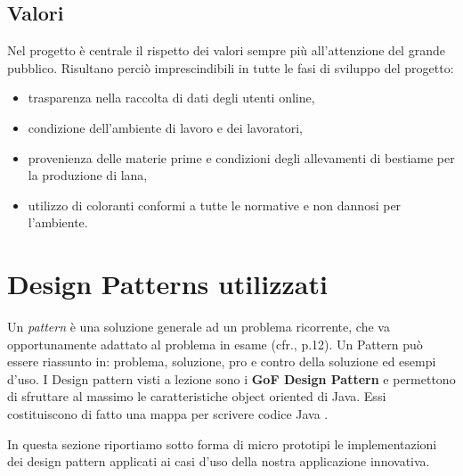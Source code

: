 \documentclass[12pt]{article}
\begin{document}
\subsection{Valori}

Nel progetto è centrale il rispetto dei valori sempre più all'attenzione del grande pubblico. Risultano perciò imprescindibili in tutte le fasi di sviluppo del progetto:

\begin{itemize}
    \item trasparenza nella raccolta di dati degli utenti online,
    \item condizione dell'ambiente di lavoro e dei lavoratori,
    \item provenienza delle materie prime e condizioni degli allevamenti di bestiame per la produzione di lana,
    \item utilizzo di coloranti conformi a tutte le normative e non dannosi per l'ambiente.
\end{itemize}


\section{Design Patterns utilizzati}

Un {\em pattern} è una soluzione generale ad un problema ricorrente, che va opportunamente adattato al problema in esame (cfr.\cite{gof_riferimento}, p.12). Un Pattern può essere riassunto in: problema, soluzione, pro e contro della soluzione ed esempi d’uso. I Design pattern visti a lezione sono i \textbf{GoF Design Pattern} e permettono di sfruttare al massimo le caratteristiche object oriented di Java. Essi costituiscono di fatto una mappa per scrivere codice Java \cite{gof_sunt}.

In questa sezione riportiamo sotto forma di micro prototipi le implementazioni dei design pattern applicati ai casi d'uso della nostra applicazione innovativa.
\end{document}
